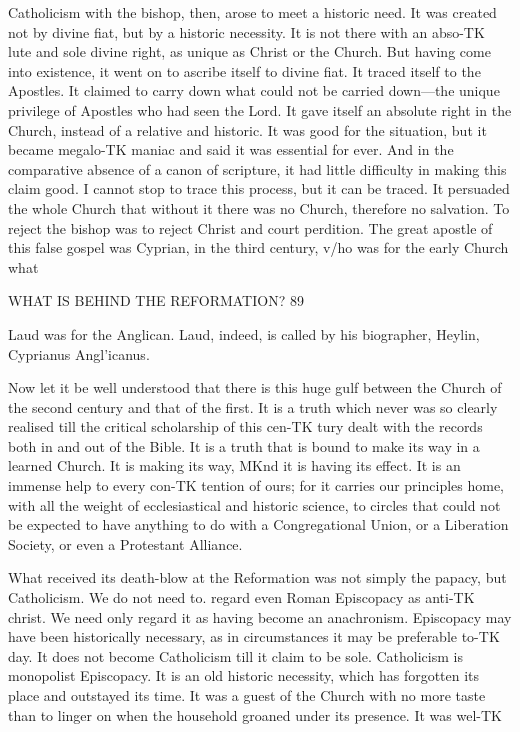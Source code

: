 \documentclass[12pt,a5paper,oneside]{book}
\begin{document}
Catholicism with the bishop, then, arose to meet a 
historic need. It was created not by divine fiat, but 
by a historic necessity. It is not there with an abso-TK
lute and sole divine right, as unique as Christ or the 
Church. But having come into existence, it went on 
to ascribe itself to divine fiat. It traced itself to the 
Apostles. It claimed to carry down what could not 
be carried down---the unique privilege of Apostles 
who had seen the Lord. It gave itself an absolute 
right in the Church, instead of a relative and historic. 
It was good for the situation, but it became megalo-TK
maniac and said it was essential for ever. And in 
the comparative absence of a canon of scripture, it 
had little difficulty in making this claim good. I 
cannot stop to trace this process, but it can be traced. 
It persuaded the whole Church that without it there 
was no Church, therefore no salvation. To reject 
the bishop was to reject Christ and court perdition. 
The great apostle of this false gospel was Cyprian, in 
the third century, v/ho was for the early Church what 



WHAT IS BEHIND THE REFORMATION? 89 

Laud was for the Anglican. Laud, indeed, is called 
by his biographer, Heylin, Cyprianus Angl'icanus. 

Now let it be well understood that there is this huge 
gulf between the Church of the second century and 
that of the first. It is a truth which never was so 
clearly realised till the critical scholarship of this cen-TK
tury dealt with the records both in and out of the 
Bible. It is a truth that is bound to make its way in 
a learned Church. It is making its way, MKnd it is 
having its effect. It is an immense help to every con-TK
tention of ours; for it carries our principles home, 
with all the weight of ecclesiastical and historic 
science, to circles that could not be expected to have 
anything to do with a Congregational Union, or a 
Liberation Society, or even a Protestant Alliance. 

What received its death-blow at the Reformation 
was not simply the papacy, but Catholicism. We do 
not need to. regard even Roman Episcopacy as anti-TK
christ. We need only regard it as having become an 
anachronism. Episcopacy may have been historically 
necessary, as in circumstances it may be preferable to-TK
day. It does not become Catholicism till it claim to be 
sole. Catholicism is monopolist Episcopacy. It is an 
old historic necessity, which has forgotten its place 
and outstayed its time. It was a guest of the Church 
with no more taste than to linger on when the 
household groaned under its presence. It was wel-TK
\end{document}
